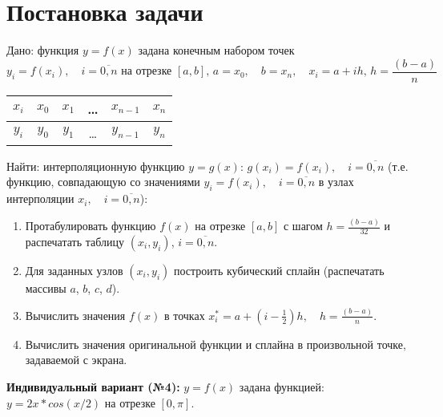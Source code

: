 \documentclass[a4paper, 14pt]{extarticle}
\begin{document}


\renewcommand{\ttdefault}{pcr}

\setlength{\tabcolsep}{3pt}



\newpage
\setcounter{page}{2}



\section{Постановка задачи}

Дано: функция \( y = f(x) \) задана конечным набором точек  
\[
y_i = f(x_i), \quad i = \overline{0, n} \text{ на отрезке } [a, b], \, a = x_0, \quad b = x_n, \quad x_i = a + ih, \, h = \frac{(b-a)}{n}
\]

\begin{table}[h!]
\centering
\begin{tabular}{|c|c|c|c|c|c|}
\hline
\( x_i \) & \( x_0 \) & \( x_1 \) & \dots & \( x_{n-1} \) & \( x_n \) \\ \hline
\( y_i \) & \( y_0 \) & \( y_1 \) & \dots & \( y_{n-1} \) & \( y_n \) \\ \hline
\end{tabular}
\end{table}

Найти: интерполяционную функцию \( y = g(x) \): \( g(x_i) = f(x_i), \quad i = \overline{0, n} \) (т.е. функцию, совпадающую со значениями \( y_i = f(x_i), \quad i = \overline{0, n} \) в узлах интерполяции \( x_i, \quad i = \overline{0, n} \)):

\begin{enumerate}
    \item Протабулировать функцию \( f(x) \) на отрезке \([a, b]\) с шагом \(h = \frac{(b-a)}{32} \) и распечатать таблицу \((x_i, y_i)\), \(i = \overline{0, n} \).
    \item Для заданных узлов \((x_i, y_i)\) построить кубический сплайн (распечатать массивы \(a\), \(b\), \(c\), \(d\)).
    \item Вычислить значения \( f(x) \) в точках \( x_i^* = a + \left( i - \frac{1}{2} \right) h, \quad h = \frac{(b-a)}{n} \).
    \item Вычислить значения оригинальной функции и сплайна в произвольной точке, задаваемой с экрана.
\end{enumerate}

\textbf{Индивидуальный вариант (№4):} \( y = f(x) \) задана функцией: \( y = 2x * cos(x/2) \) на отрезке \([0, \pi]\).
\end{document}
